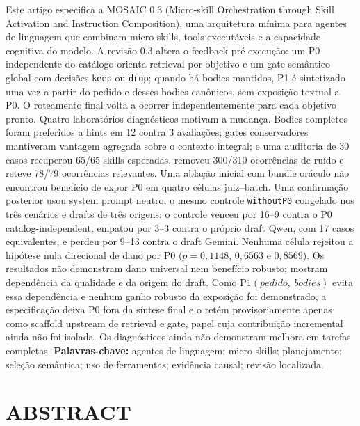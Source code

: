 \documentclass[12pt,a4paper]{article}
\begin{document}
Este artigo especifica a MOSAIC 0.3 (Micro-skill Orchestration through Skill Activation and Instruction Composition), uma arquitetura mínima para agentes de linguagem que combinam micro skills, tools executáveis e a capacidade cognitiva do modelo. A revisão 0.3 altera o feedback pré-execução: um P0 independente do catálogo orienta retrieval por objetivo e um gate semântico global com decisões \texttt{keep} ou \texttt{drop}; quando há bodies mantidos, P1 é sintetizado uma vez a partir do pedido e desses bodies canônicos, sem exposição textual a P0. O roteamento final volta a ocorrer independentemente para cada objetivo pronto. Quatro laboratórios diagnósticos motivam a mudança. Bodies completos foram preferidos a hints em 12 contra 3 avaliações; gates conservadores mantiveram vantagem agregada sobre o contexto integral; e uma auditoria de 30 casos recuperou 65/65 skills esperadas, removeu 300/310 ocorrências de ruído e reteve 78/79 ocorrências relevantes. Uma ablação inicial com bundle oráculo não encontrou benefício de expor P0 em quatro células juiz--batch. Uma confirmação posterior usou system prompt neutro, o mesmo controle \texttt{withoutP0} congelado nos três cenários e drafts de três origens: o controle venceu por 16--9 contra o P0 catalog-independent, empatou por 3--3 contra o próprio draft Qwen, com 17 casos equivalentes, e perdeu por 9--13 contra o draft Gemini. Nenhuma célula rejeitou a hipótese nula direcional de dano por P0 (\(p=0{,}1148\), \(0{,}6563\) e \(0{,}8569\)). Os resultados não demonstram dano universal nem benefício robusto; mostram dependência da qualidade e da origem do draft. Como \(\mathrm{P1}(pedido,\ bodies)\) evita essa dependência e nenhum ganho robusto da exposição foi demonstrado, a especificação deixa P0 fora da síntese final e o retém provisoriamente apenas como scaffold upstream de retrieval e gate, papel cuja contribuição incremental ainda não foi isolada. Os diagnósticos ainda não demonstram melhora em tarefas completas. \textbf{Palavras-chave:} agentes de linguagem; micro skills; planejamento; seleção semântica; uso de ferramentas; evidência causal; revisão localizada.



\section*{ABSTRACT}
\end{document}
